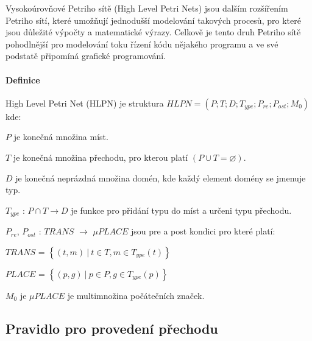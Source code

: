 Vysokoúrovňové Petriho sítě (High Level Petri Nets) jsou dalším rozšířením Petriho sítí, které umožňují jednodušší modelování takových procesů, pro které jsou důležité výpočty a matematické výrazy. Celkově je tento druh Petriho sítě pohodlnější pro modelování toku řízení kódu nějakého programu a ve své podstatě připomíná grafické programování.

\paragraph{Definice} \cite[p.11--12]{pnstd54}

High Level Petri Net (HLPN) je struktura $HLPN = \left( P; T; D; T_{ype}; P_{re}; P_{ost}; M_0\right) $ kde:

\begin{itemize}
  \item $P$ je konečná množina míst. \\
  \item $T$ je konečná množina přechodu, pro kterou platí $\left(P \cup T = \varnothing\right)$. \\
  \item $D$ je konečná neprázdná množina domén, kde každý element domény se jmenuje typ. \\
  \item $T_{ype}$ : $P \cap T \rightarrow D$ je funkce pro přidání typu do míst a určeni typu přechodu.
  \item $P_{re}$, $P_{ost}$ : $TRANS$ $\rightarrow$ $\mu PLACE$ jsou pre a post kondici pro které platí: \\
  \begin{center}
    \item $TRANS$ = $\left\{\left(t, m\right)\:\vert\:t \in T, m \in T_{ype} \left( t \right)\right\}$ \\
    \item $PLACE$ = $\left\{\left(p, g\right)\:\vert\:p \in P, g \in T_{ype} \left( p \right)\right\}$ \\
  \end{center}
  \item $M_0$ je $\mu PLACE$ je multimnožina počátečních značek.
\end{itemize}

\subsection{Pravidlo pro provedení přechodu}
\label{subsec:graph-transition}

